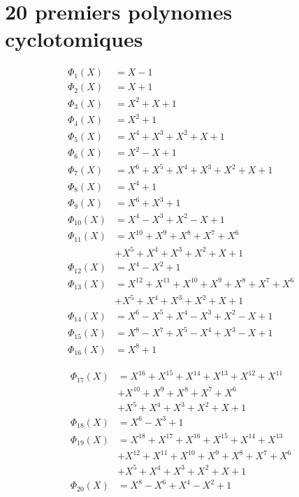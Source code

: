 \appendix
\chapter{20 premiers polynomes cyclotomiques}

\begin{align}
	\Phi_{1}(X) & = X - 1 \\
	\Phi_{2}(X) & = X + 1 \\
	\Phi_{3}(X) & = X^2 + X + 1 \\
	\Phi_{4}(X) & = X^2 + 1 \\
	\Phi_{5}(X) & = X^4 + X^3 + X^2 + X + 1 \\
	\Phi_{6}(X) & = X^2 - X + 1 \\
	\Phi_{7}(X) & = X^6+X^5+X^4 + X^3 + X^2 + X + 1 \\
	\Phi_{8}(X) & = X^4 + 1 \\
	\Phi_{9}(X) & = X^{6} + X^{3} + 1\\
	\Phi_{10}(X) & = X^{4} - X^{3} + X^{2} - X + 1 \\
	\Phi_{11}(X) & = X^{10} + X^{9} + X^{8} + X^{7} + X^6 \\
				& + X^5 + X^4 + X^3 + X^2 + X + 1 \\
	\Phi_{12}(X) & = X^{4} - X^{2} + 1 \\
	\Phi_{13}(X) & = X^{12} + X^{11} + X^{10} + X^{9} + X^{8} + X^{7} + X^6 \\
				& + X^5+X^4 + X^3 + X^2 + X + 1 \\
	\Phi_{14}(X) & = X^6 - X^5 + X^4 - X^3 + X^2 - X + 1 \\
	\Phi_{15}(X) & = X^8 - X^7 + X^5 - X^4 + X^3 - X + 1 \\
	\Phi_{16}(X) & = X^{8} + 1
\end{align}

\begin{align}
	\Phi_{17}(X) & = X^{16} + X^{15} + X^{14} + X^{13} + X^{12} + X^{11} \\
				& + X^{10} + X^{9} + X^{8} + X^{7} + X^6 \\
				& + X^5 + X^4 + X^3 + X^2 + X + 1 \\
	\Phi_{18}(X) & = X^{6} - X^{3} + 1 \\
	\Phi_{19}(X) & = X^{18} + X^{17} + X^{16} + X^{15} + X^{14} + X^{13} \\
				& + X^{12} + X^{11} + X^{10} + X^{9} + X^{8} + X^{7} + X^6 \\
				& + X^5 + X^4 + X^3 + X^2 + X + 1 \\
	\Phi_{20}(X) & = X^{8} - X^{6} + X^{4} - X^{2} + 1
\end{align}
